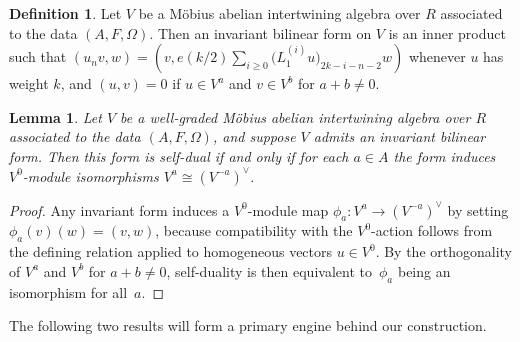 \documentclass[pdftex]{sigma}
\newtheorem{lem}[thm]{Lemma}
\theoremstyle{definition}
\newtheorem{defn}[thm]{Definition}
\begin{document}
\begin{defn}Let $V$ be a M\"obius abelian intertwining algebra over $R$ associated to the data $(A,F,\Omega)$. Then an invariant bilinear form on $V$ is an inner product such that $(u_n v,w) = (v, e(k/2) \sum\limits_{i \geq 0} \big(L_1^{(i)} u\big)_{2k-i-n-2}w)$ whenever $u$ has weight $k$, and $(u,v) = 0$ if $u \in V^a$ and $v \in V^b$ for $a+b \neq 0$.
\end{defn}

\begin{lem}Let $V$ be a well-graded M\"obius abelian intertwining algebra over $R$ associated to the data $(A,F,\Omega)$, and suppose $V$ admits an invariant bilinear form. Then this form is self-dual if and only if for each $a \in A$ the form induces $V^0$-module isomorphisms $V^a \cong (V^{-a})^\vee$.
\end{lem}
\begin{proof}Any invariant form induces a $V^0$-module map $\phi_a\colon V^a \to (V^{-a})^\vee$ by setting $\phi_a(v)(w) = (v,w)$, because compatibility with the $V^0$-action follows from the defining relation applied to homogeneous vectors $u \in V^0$. By the orthogonality of $V^a$ and $V^b$ for $a+b \neq 0$, self-duality is then equivalent to~$\phi_a$ being an isomorphism for all~$a$.
\end{proof}

The following two results will form a primary engine behind our construction.
\end{document}
